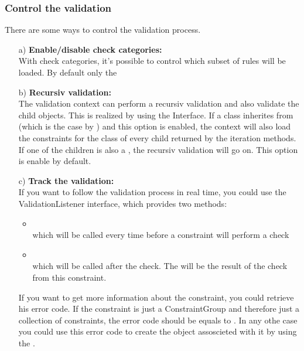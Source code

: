 \subsubsection{Control the validation}
There are some ways to control the validation process.
\begin{itemize}
\item[a)] \textbf{Enable/disable check categories:}\\
With check categories, it's possible to control which subset of rules will be loaded. By default only the 
\item[b)] \textbf{Recursiv validation:}\\
The validation context can perform a recursiv validation and also validate the child objects. This is realized by using the \TreeNode Interface. If a class inherites from \TreeNode (which is the case by \SBase) and this option is enabled, the context will also load the constraints for the class of every child returned by the \TreeNode iteration methods. If one of the children is also a \TreeNode, the recursiv validation will go on. This option is enable by default.
\item[c)] \textbf{Track the validation:}\\
If you want to follow the validation process in real time, you could use the ValidationListener interface, which provides two methods:
\begin{itemize}
\item {} \\ 
which will be called every time before a constraint will perform a check
\item {} \\
which will be called after the check. The  will be the result of the check from this constraint.
\end{itemize}
If you want to get more information about the constraint, you could retrieve his error code. If the constraint is just a ConstraintGroup and therefore just a collection of constraints, the error code should be equals to . In any othe case you could use this error code to create the  object assoscieted with it by using the .
\end{itemize}


